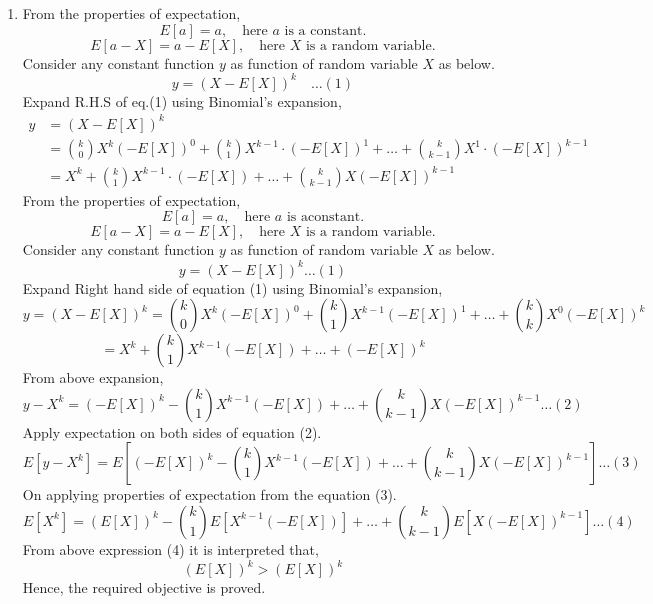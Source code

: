 \documentclass{article}
\begin{document}
\begin{enumerate}
\newpage
\item 
    From the properties of expectation,    
    \[
        E[a] = a, \quad \text{here } a \text{ is a constant.}
    \]
    \[
        E[a - X] = a - E[X], \quad \text{here } X \text{ is a random variable.}
    \]
    Consider any constant function \( y \) as function of random variable \( X \) as below.
    \[
        y = (X - E[X])^k \quad \ldots (1)
    \]  
    Expand R.H.S of eq.(1) using Binomial's expansion,
    \begin{align*}
        y &= (X - E[X])^k \\
          &= \binom{k}{0} X^k (-E[X])^0 + \binom{k}{1} X^{k-1}\cdot(-E[X])^1 + \ldots + \binom{k}{k-1} X^1\cdot(-E[X])^{k-1} \\
          &= X^k + \binom{k}{1} X^{k-1}\cdot(-E[X]) + \ldots + \binom{k}{k-1} X(-E[X])^{k-1}
    \end{align*}
    From the properties of expectation, 
    \begin{equation*}
        E[a] = a, \quad \text{here } a \text{ is aconstant.}
    \end{equation*}
    \begin{equation*}
        E[a - X] = a - E[X], \quad \text{here } X \text{ is a random variable.}
    \end{equation*} 
    Consider any constant function \( y \) as function of random variable \( X \) as below.
    \begin{equation}
        y = (X - E[X])^k \ldots (1)
    \end{equation}
        Expand Right hand side of equation (1) using Binomial's expansion,
    \begin{equation*}
        y = (X - E[X])^k = \binom{k}{0}X^k(-E[X])^0 + \binom{k}{1}X^{k-1}(-E[X])^1 + \ldots + \binom{k}{k}X^0(-E[X])^k
    \end{equation*}
    \begin{equation*}
        = X^k + \binom{k}{1}X^{k-1}(-E[X]) + \ldots + (-E[X])^k
    \end{equation*}
    From above expansion,
    \begin{equation*}
        y - X^k = (-E[X])^k - \binom{k}{1}X^{k-1}(-E[X]) + \ldots + \binom{k}{k-1}X(-E[X])^{k-1} \ldots (2)
    \end{equation*} 
    Apply expectation on both sides of equation (2). 
    \begin{equation*}
        E[y - X^k] = E[(-E[X])^k - \binom{k}{1}X^{k-1}(-E[X]) + \ldots + \binom{k}{k-1}X(-E[X])^{k-1}] \ldots (3)
    \end{equation*}  
    On applying properties of expectation from the equation (3).  
    \begin{equation*}
        E[X^k] = (E[X])^k - \binom{k}{1}E[X^{k-1}(-E[X])] + \ldots + \binom{k}{k-1}E[X(-E[X])^{k-1}] \ldots (4)
    \end{equation*}
    From above expression (4) it is interpreted that, 
    \begin{equation*}
        (E[X])^k > (E[X])^k
    \end{equation*}
    Hence, the required objective is proved.
\end{enumerate}
\end{document}
